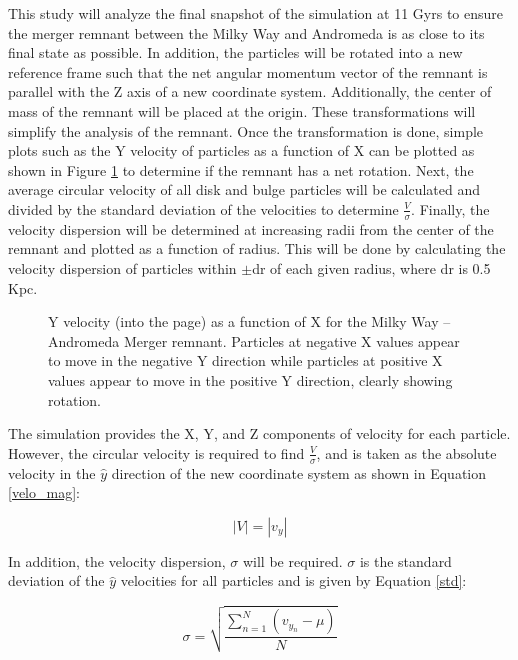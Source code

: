 \documentclass[twocolumn]{aastex63}
\begin{document}
This study will analyze the final snapshot of the simulation at 11 Gyrs to ensure the merger remnant between the Milky Way and Andromeda is as close to its final state as possible. In addition, the particles will be rotated into a new reference frame such that the net angular momentum vector of the remnant is parallel with the Z axis of a new coordinate system. Additionally, the center of mass of the remnant will be placed at the origin. These transformations will simplify the analysis of the remnant. Once the transformation is done, simple plots such as the Y velocity of particles as a function of X can be plotted as shown in Figure \ref{velocity} to determine if the remnant has a net rotation. Next, the average circular velocity of all disk and bulge particles will be calculated and divided by the standard deviation of the velocities to determine $\frac{V}{\sigma}$. Finally, the velocity dispersion will be determined at increasing radii from the center of the remnant and plotted as a function of radius. This will be done by calculating the velocity dispersion of particles within $\pm$dr of each given radius, where dr is 0.5 Kpc.\\

\begin{figure}
    \centering
    \caption{Y velocity (into the page) as a function of X for the Milky Way -- Andromeda Merger remnant. Particles at negative X values appear to move in the negative Y direction while particles at positive X values appear to move in the positive Y direction, clearly showing rotation.}
    \label{velocity}
\end{figure}

The simulation provides the X, Y, and Z components of velocity for each particle. However, the circular velocity is required to find $\frac{V}{\sigma}$, and is taken as the absolute velocity in the $\hat{y}$ direction of the new coordinate system as shown in Equation \ref{velo_mag}:

\begin{equation}
    |V|=|v_y|
    \label{velo_mag}
\end{equation}

In addition, the velocity dispersion, $\sigma$ will be required. $\sigma$ is the standard deviation of the $\hat{y}$ velocities for all particles and is given by Equation \ref{std}:

\begin{equation}
    \sigma=\sqrt{\frac{\sum\limits_{n=1}^{N} (v_{y_n}-\mu)}{N}}
    \label{std}
\end{equation}
\end{document}
